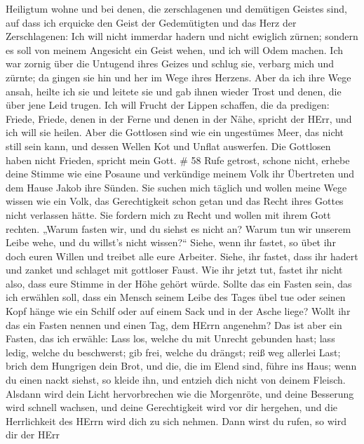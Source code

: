 Heiligtum wohne und bei denen, die zerschlagenen und demütigen Geistes
sind, auf dass ich erquicke den Geist der Gedemütigten und das Herz der
Zerschlagenen:  Ich will nicht immerdar hadern und nicht
ewiglich zürnen; sondern es soll von meinem Angesicht ein Geist wehen,
und ich will Odem machen.  Ich war zornig über die Untugend
ihres Geizes und schlug sie, verbarg mich und zürnte; da gingen sie hin
und her im Wege ihres Herzens.  Aber da ich ihre Wege
ansah, heilte ich sie und leitete sie und gab ihnen wieder Trost und
denen, die über jene Leid trugen.  Ich will Frucht der
Lippen schaffen, die da predigen: Friede, Friede, denen in der Ferne und
denen in der Nähe, spricht der HErr, und ich will sie heilen.
 Aber die Gottlosen sind wie ein ungestümes Meer, das nicht
still sein kann, und dessen Wellen Kot und Unflat auswerfen.
 Die Gottlosen haben nicht Frieden, spricht mein Gott. \#
58  Rufe getrost, schone nicht, erhebe deine Stimme wie eine
Posaune und verkündige meinem Volk ihr Übertreten und dem Hause Jakob
ihre Sünden.  Sie suchen mich täglich und wollen meine Wege
wissen wie ein Volk, das Gerechtigkeit schon getan und das Recht ihres
Gottes nicht verlassen hätte. Sie fordern mich zu Recht und wollen mit
ihrem Gott rechten.  „Warum fasten wir, und du siehst es
nicht an? Warum tun wir unserem Leibe wehe, und du willst's nicht
wissen?{}`` Siehe, wenn ihr fastet, so übet ihr doch euren Willen und
treibet alle eure Arbeiter.  Siehe, ihr fastet, dass ihr
hadert und zanket und schlaget mit gottloser Faust. Wie ihr jetzt tut,
fastet ihr nicht also, dass eure Stimme in der Höhe gehört würde.
 Sollte das ein Fasten sein, das ich erwählen soll, dass ein
Mensch seinem Leibe des Tages übel tue oder seinen Kopf hänge wie ein
Schilf oder auf einem Sack und in der Asche liege? Wollt ihr das ein
Fasten nennen und einen Tag, dem HErrn angenehm?  Das ist
aber ein Fasten, das ich erwähle: Lass los, welche du mit Unrecht
gebunden hast; lass ledig, welche du beschwerst; gib frei, welche du
drängst; reiß weg allerlei Last;  brich dem Hungrigen dein
Brot, und die, die im Elend sind, führe ins Haus; wenn du einen nackt
siehst, so kleide ihn, und entzieh dich nicht von deinem Fleisch.
 Alsdann wird dein Licht hervorbrechen wie die Morgenröte,
und deine Besserung wird schnell wachsen, und deine Gerechtigkeit wird
vor dir hergehen, und die Herrlichkeit des HErrn wird dich zu sich
nehmen.  Dann wirst du rufen, so wird dir der HErr
